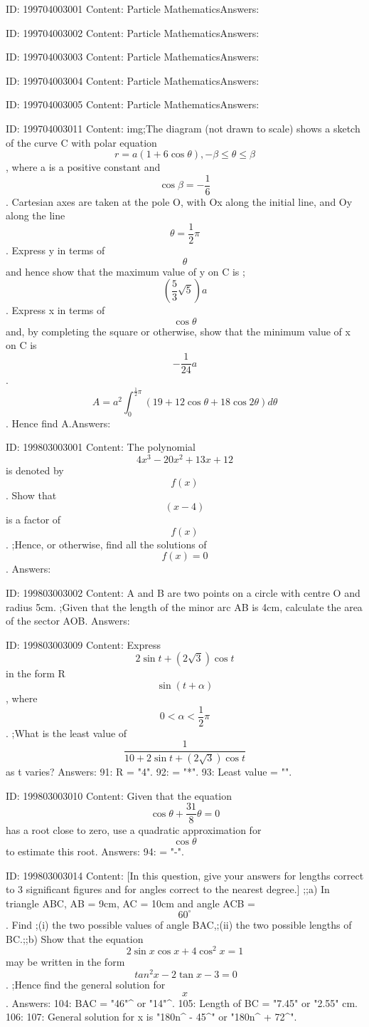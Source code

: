 \documentclass{article}
\begin{document}
ID: 199704003001
Content:
Particle MathematicsAnswers:

ID: 199704003002
Content:
Particle MathematicsAnswers:

ID: 199704003003
Content:
Particle MathematicsAnswers:

ID: 199704003004
Content:
Particle MathematicsAnswers:

ID: 199704003005
Content:
Particle MathematicsAnswers:

ID: 199704003011
Content:
img;The diagram (not drawn to scale) shows a sketch of the curve C with polar equation \[r = a(1 + 6\cos \theta), -\beta \leq \theta \leq \beta\], where a is a positive constant and \[\cos \beta = - \frac {1}{6}\]. Cartesian axes are taken at the pole O, with Ox along the initial line, and Oy along the line \[\theta = \frac {1}{2} \pi\]. Express y in terms of \[\theta\] and hence show that the maximum value of y on C is ;\[(\frac {5}{3} \sqrt{5})a\]. Express x in terms of \[\cos \theta\] and, by completing the square or otherwise, show that the minimum value of x on C is \[- \frac {1}{24}a\]. \[A = a^{2}\int_{0}^{\frac {1}{2} \pi} (19 + 12\cos \theta + 18 \cos 2\theta)d \theta\]. Hence find A.Answers:

ID: 199803003001
Content:
The polynomial $$4 x^3 - 20 x^2 + 13x + 12$$  is denoted by $$f(x)$$. Show that $$(x - 4)$$ is a factor of $$f(x)$$. ;Hence, or otherwise, find all the solutions of $$f(x) = 0$$. Answers:

ID: 199803003002
Content:
A and B are two points on a circle with centre O and radius 5cm. ;Given that the length of the minor arc AB is 4cm, calculate the area of the sector AOB. Answers:

ID: 199803003009
Content:
Express $$2\sin  t + ( 2\sqrt{3} )\cos  t$$ in the form R $$\sin  ( t + \alpha )$$, where $$0 < \alpha < \frac{1}{2}\pi$$. ;What is the least value of $$\frac{1}{10 + 2\sin  t + ( 2\sqrt{3} )\cos  t}$$ as t varies? Answers:
91: R = "4".
92: \alpha = "*\pi".
93: Least value = "".

ID: 199803003010
Content:
Given that the equation $$\cos  \theta + \frac{31}{8}\theta = 0 $$ has a root close to zero, use a quadratic approximation for $$\cos  \theta$$ to estimate this root. Answers:
94: \theta = "-".

ID: 199803003014
Content:
[In this question, give your answers for lengths correct to 3 significant figures and for angles correct to the nearest degree.] ;;a)  In triangle ABC, AB = 9cm, AC = 10cm and angle ACB = $$60^{\circ}$$. Find ;(i) the two possible values of angle BAC,;(ii) the two possible lengths of BC.;;b) Show that the equation $$2\sin  x  \cos  x + 4 {\cos }^2 x = 1$$  may be written in the form $${\ tan }^2 x - 2\tan  x - 3 = 0$$. ;Hence find the general solution for $$x$$. Answers:
104: \angle BAC  = "46"^{\circ} or "14"^{\circ}.
105: Length of BC = "7.45" or "2.55" cm.
106: 
107: General solution for x is "180n^{\circ} - 45^{\circ}" or "180n^{\circ} + 72^{\circ}".
\end{document}
